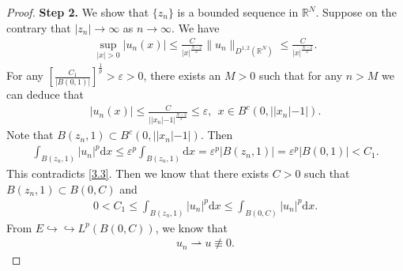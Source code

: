 \documentclass[12pt,a4paper,reqno]{amsart}
\numberwithin{equation}{section}
\begin{document}
\begin{proof}
{\bf Step 2.}
We show that $\{z_{n}\}$ is a bounded sequence in $\mathbb{R}^{N}$.
Suppose on the contrary that
$|z_{n}|\rightarrow\infty$
as
$n\rightarrow\infty$.
We have
\begin{align*}
\sup_{|x|>0}
|u_{n}(x)|
\leqslant
\frac{C}{|x|^{\frac{N-2}{2}}}
\|u_{n}\|_{D^{1,2}(\mathbb{R}^{N})}
\leqslant
\frac{C}{|x|^{\frac{N-2}{2}}}.
\end{align*}
For any
$\left[\frac{C_{1}}{|B(0,1)|}\right]^{\frac{1}{p}}>\varepsilon>0$,
there exists an $M>0$ such that for any $n>M$ we can deduce that
\begin{align*}
|u_{n}(x)|
\leqslant
\frac{C}
{||x_{n}|-1|^{\frac{N-2}{2}}}
\leqslant
\varepsilon,
\ ~x\in B^{c}(0,||x_{n}|-1|).
\end{align*}
Note that
$B(z_{n},1)\subset B^{c}(0,||x_{n}|-1|)$.
Then
\begin{align*}
\int_{B(z_{n},1)}
|u_{n}|^{p}
\mathrm{d}x
\leqslant
\varepsilon^{p}
\int_{B(z_{n},1)}
\mathrm{d}x
=
\varepsilon^{p}
|B(z_{n},1)|
=
\varepsilon^{p}
|B(0,1)|
<C_{1}.
\end{align*}
This contradicts \eqref{3.3}.
Then we know that there exists $C>0$ such that $B(z_{n},1)\subset B(0,C)$ and
\begin{equation*}
\begin{aligned}
0<C_{1}\leqslant\int_{B(z_{n},1)}
|u_{n}|^{p}
\mathrm{d}x
\leqslant
\int_{B(0,C)}
|u_{n}|^{p}
\mathrm{d}x.
\end{aligned}
\end{equation*}
From $E\hookrightarrow\hookrightarrow L^{p}(B(0,C))$, we know that
\begin{equation*}
\begin{aligned}
u_{n}\rightharpoonup u\not\equiv 0.
\end{aligned}
\end{equation*}


\end{proof}
\end{document}
